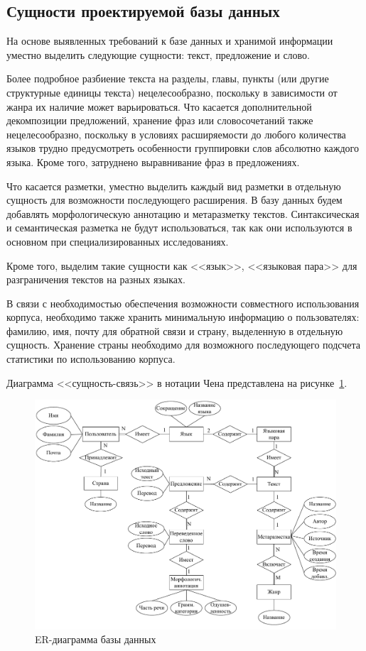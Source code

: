 \subsection{Сущности проектируемой базы данных}

На основе выявленных требований к базе данных и хранимой информации уместно выделить следующие сущности: текст, предложение и слово. 

Более подробное разбиение текста на разделы, главы, пункты (или другие структурные единицы текста) нецелесообразно, поскольку в зависимости от жанра их наличие может варьироваться. 
Что касается дополнительной декомпозиции предложений, хранение фраз или словосочетаний также нецелесообразно, поскольку в условиях расширяемости до любого количества языков трудно предусмотреть особенности группировки слов абсолютно каждого языка. 
Кроме того, затруднено выравнивание фраз в предложениях.

Что касается разметки, уместно выделить каждый вид разметки в отдельную сущность для возможности последующего расширения. 
В базу данных будем добавлять морфологическую аннотацию и метаразметку текстов. 
Синтаксическая и семантическая разметка не будут использоваться, так как они используются в основном при специализированных исследованиях.

Кроме того, выделим такие сущности как <<язык>>, <<языковая пара>> для разграничения текстов на разных языках.

В связи с необходимостью обеспечения возможности совместного использования корпуса, необходимо также хранить минимальную информацию о пользователях: фамилию, имя, почту для обратной связи и страну, выделенную в отдельную сущность. 
Хранение страны необходимо для возможного последующего подсчета статистики по использованию корпуса.

Диаграмма <<сущность-связь>> в нотации Чена представлена на рисунке~\ref{erd}.

\begin{figure}[ht]
	\centering
	\includegraphics[width=\textwidth]{img/ERD.pdf}
	\caption{ER-диаграмма базы данных}
	\label{erd}
\end{figure}\pagebreak

